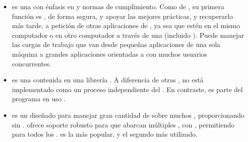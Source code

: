 \begin{itemize}
		\item
			\textbf{\postgresql} es una \ordbms con énfasis en \extensibilityQA y normas de cumplimiento. Como \serverAS de \dataBasesDB, su primera función es \store \dataPC, de forma segura, y apoyar las mejores prácticas, y recuperarlo más tarde, a petición de otras aplicaciones de \softwarePC, ya sea que estén \runningCPT en el mismo computador o \runningCPT en otro computador a través  de una \networkINT (incluido \internetINT). Puede manejar las cargas de trabajo que van desde pequeñas aplicaciones de una sola máquina a grandes aplicaciones orientadas a \internetINT con muchos usuarios concurrentes.
	
		\item
			\textbf{\sqlite} es una \rdbms contenida en una librería \cprogramming. A diferencia de otras \dbmangesystem, \sqlite no está implementado como un proceso independiente del \clientAS. En contraste, es parte del programa en uso \cite{online_video_introduction_sqlite}.
	
		\item
			\textbf{\cassandraNAME} es un \nosqlNAME \wideColumnDB \store \openSourcePC diseñado para manejar gran cantidad de \dataPC sobre muchos \commodityServerPC, proporcionando \highAvailabilityDB sin \singlePointFailurePC. \cassandraNAME ofrece soporte robusto para \clustersAS que abarcan múltiples \dataCentersPC \cite{online_cassandra_multi_def}, con \masterlessDB \asynRepDB, permitiendo \lowLatencyOperationsINT para todos los \clientsAS. \cassandraNAME es la \wideColumnDB \store más popular, y el segundo \nosqlNAME más utilizado\cite{online_db_engines_ranking}.
	

\end{itemize}
